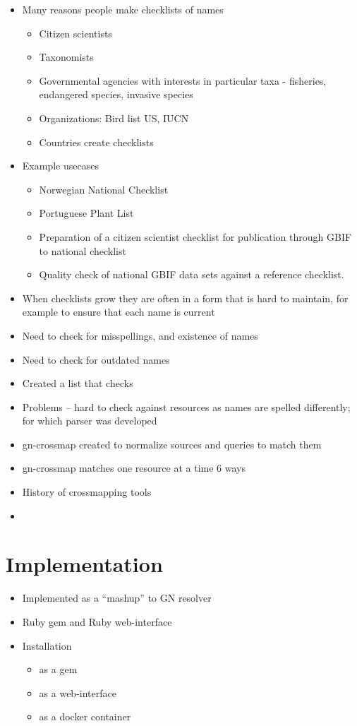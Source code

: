 \documentclass{bmcart}
\begin{document}
  \begin{itemize}

  \item Many reasons people make checklists of names
    \begin{itemize}
      \item Citizen scientists
      \item Taxonomists
      \item Governmental agencies with interests in particular taxa - fisheries, endangered species, invasive species
      \item Organizations: Bird list US, IUCN
      \item Countries create checklists
    \end{itemize}
  \item Example usecases 
    \begin{itemize}
      \item Norwegian National Checklist
      \item Portuguese Plant List
      \item Preparation of a citizen scientist checklist for publication
        through GBIF to national checklist
      \item Quality check of national GBIF data sets against a reference
        checklist.
    \end{itemize}
  \item When checklists grow they are often in a form that is hard to maintain, for example to ensure that each name is current
  \item Need to check for misspellings, and existence of names
  \item Need to check for outdated names
  \item Created a list that checks
  \item Problems -- hard to check against resources as names are spelled
    differently; for which parser was developed
  \item gn-crossmap created to normalize sources and queries to match them
  \item gn-crossmap matches one resource at a time 6 ways
  \item History of crossmapping tools
      \item 
\end{itemize}

\section*{Implementation}
\begin{itemize}
  \item Implemented as a ``mashup'' to GN resolver
  \item Ruby gem and Ruby web-interface
  \item Installation
    \begin{itemize}
      \item as a gem
      \item as a web-interface
      \item as a docker container
    \end{itemize}
\end{itemize}
\end{document}
